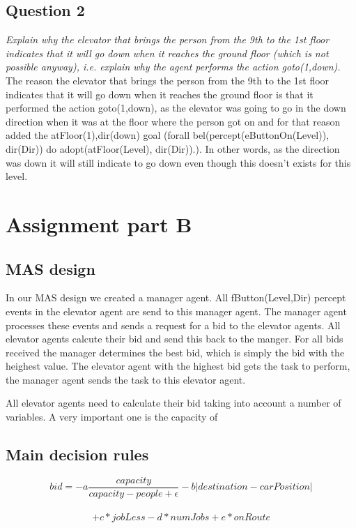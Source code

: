 \documentclass[a4paper,11pt]{article}
\begin{document}
\subsection{Question 2}

\textit{Explain why the elevator that brings the person from the 9th to the 1st floor indicates that it will go down when it reaches the ground floor (which is not possible anyway), i.e. explain why the agent performs the action goto(1,down).}
\newline\newline
The reason the elevator that brings the person from the 9th to the 1st floor indicates that it will go down when it reaches the ground floor is that it performed the action goto(1,down), as the elevator was going to go in the down direction when it was at the floor where the person got on and for that reason added the atFloor(1),dir(down) goal (forall bel(percept(eButtonOn(Level)), dir(Dir)) do adopt(atFloor(Level), dir(Dir)).). In other words, as the direction was down it will still indicate to go down even though this doesn't exists for this level.

\section{Assignment part B}

\subsection{MAS design}
In our MAS design we created a manager agent. All fButton(Level,Dir) percept events in the elevator agent are send to this manager agent. The manager agent processes these events and sends a request for a bid to the elevator agents. All elevator agents calcute their bid and send this back to the manger. For all bids received the manager determines the best bid, which is simply the bid with the heighest value. The elevator agent with the highest bid gets the task to perform, the manager agent sends the task to this elevator agent. 

All elevator agents need to calculate their bid taking into account a number of variables. A very important one is the capacity of 


\subsection{Main decision rules}

\[bid = -a\frac{capacity}{capacity-people+\epsilon} - b|destination - carPosition|\]\\ \[+ c*jobLess - d*numJobs + e*onRoute\]
\end{document}
